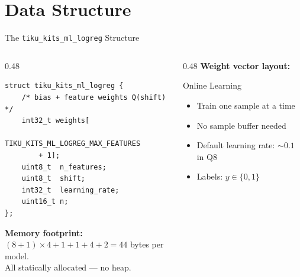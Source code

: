 \documentclass[aspectratio=169, 10pt]{beamer}
\begin{document}
\section{Data Structure}

\begin{frame}[fragile]{The \texttt{tiku\_kits\_ml\_logreg} Structure}
\begin{columns}[T]
\begin{column}{0.48\textwidth}
\begin{lstlisting}[style=cstyle,
  title={ml/classification/tiku\_kits\_ml\_logreg.h}]
struct tiku_kits_ml_logreg {
    /* bias + feature weights Q(shift) */
    int32_t weights[
        TIKU_KITS_ML_LOGREG_MAX_FEATURES
        + 1];
    uint8_t  n_features;
    uint8_t  shift;
    int32_t  learning_rate;
    uint16_t n;
};
\end{lstlisting}

\vspace{0.3em}
\textbf{Memory footprint:}\\
$(8+1) \times 4 + 1 + 1 + 4 + 2 = 44$ bytes per model.\\
All statically allocated --- no heap.
\end{column}

\begin{column}{0.48\textwidth}
\textbf{Weight vector layout:}
\begin{center}
\end{center}

\vspace{1em}
\begin{block}{Online Learning}
\begin{itemize}
  \item Train one sample at a time
  \item No sample buffer needed
  \item Default learning rate: $\sim 0.1$ in Q8
  \item Labels: $y \in \{0, 1\}$
\end{itemize}
\end{block}
\end{column}
\end{columns}
\end{frame}
\end{document}
